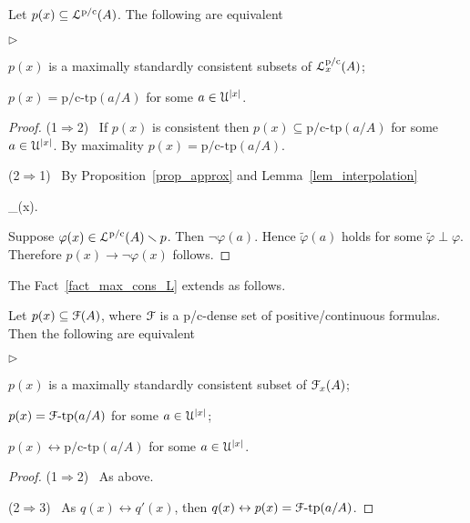 \documentclass{amsproc}
\newcommand{\mylabel}[1]{{#1}\hfill}
\renewenvironment{itemize}
  {\begin{list}{$\triangleright$}{%
  \setlength{\parskip}{0mm}
  \setlength{\topsep}{.4\baselineskip}
  \setlength{\rightmargin}{0mm}
  \setlength{\listparindent}{0mm}
  \setlength{\itemindent}{0mm}
  \setlength{\labelwidth}{3ex}
  \setlength{\itemsep}{.2\baselineskip}
  \setlength{\parsep}{.2\baselineskip}
  \setlength{\partopsep}{0mm}
  \setlength{\labelsep}{1ex}
  \setlength{\leftmargin}{\labelwidth+\labelsep}
  \let\makelabel\mylabel}}{%
\end{list}}
\begin{document}
{\begin{fact}\label{fact_max_cons_L}
  Let $p(x)\subseteq{\EuScript L}^{\rm p/c}(A)$.
  The following are equivalent
  \begin{itemize}
    \item[1.] $p(x)$ is a maximally standardly consistent subsets of ${\EuScript L}^{\rm p/c}_x(A)$;
    \item[2.] $p(x)=\mbox{p/c-tp}(a/A)$ for some $a\in{\EuScript U}^{|x|}$.
  \end{itemize}
\end{fact}

\begin{proof}
  (1$\Rightarrow$2) \ 
  If $p(x)$ is consistent then $p(x)\subseteq\mbox{p/c-tp}(a/A)$  for some $a\in{\EuScript U}^{|x|}$.
  By maximality $p(x)=\mbox{p/c-tp}(a/A)$.

  (2$\Rightarrow$1) \ 
  By Proposition~\ref{prop_approx} and Lemma~\ref{lem_interpolation}

  \ceq{\hfill\varphi(x)}
  {\leftrightarrow}
  {\bigwedge_{\tilde\varphi\perp\varphi}\neg\tilde\varphi(x).}

  Suppose $\varphi(x)\in{\EuScript L}^{\rm p/c}(A)\smallsetminus  p$.
  Then $\neg\varphi(a)$.
  Hence $\tilde\varphi(a)$ holds for some $\tilde\varphi\perp\varphi$.
  Therefore $p(x)\rightarrow\neg\varphi(x)$ follows.
\end{proof}

The Fact~\ref{fact_max_cons_L} extends as follows.

\begin{fact}\label{fact_max_cons_F}
  Let $p(x)\subseteq{\EuScript F}(A)$, where ${\EuScript F}$ is a p/c-dense set of positive/continuous formulas.
  Then the following are equivalent 
  \begin{itemize}
    \item[1.] $p(x)$ is a maximally standardly consistent subset of ${\EuScript F}_x(A)$;
    \item[2.] $p(x)={\EuScript F}\mbox{-tp}(a/A)$ for some $a\in{\EuScript U}^{|x|}$;
    \item[3.] $p(x)\leftrightarrow\mbox{p/c-tp}(a/A)$ for some $a\in{\EuScript U}^{|x|}$.
  \end{itemize}

\end{fact}
  
\begin{proof}
  (1$\Rightarrow$2) \ 
  As above.
  
  (2$\Rightarrow$3) \ 
  As $q(x)\leftrightarrow q'(x)$, then $q(x)\leftrightarrow p(x)={\EuScript F}\mbox{-tp}(a/A)$.


\end{proof}}
\end{document}

